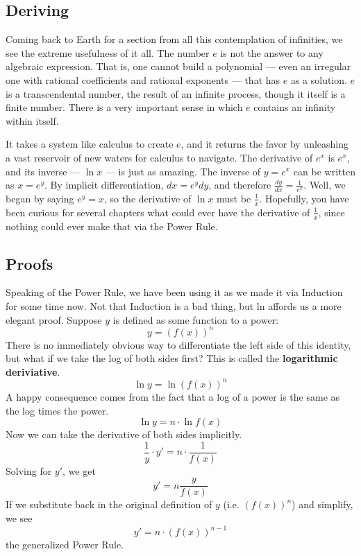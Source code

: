 
\subsection{Deriving}



Coming back to Earth for a section from all this contemplation of infinities, we see the
extreme usefulness of it all.  The number $e$ is not the answer to any algebraic 
expression.  That is, one cannot build a polynomial --- even an irregular one with
rational coefficients and rational exponents --- that has $e$ as a solution.  $e$ is a
transcendental number, the result of an infinite process, though it itself is a finite number.
There is a very important sense in which $e$ contains an infinity within itself.

It takes a system like calculus to create $e$, and it returns the favor by unleashing a
vast reservoir of new waters for calculus to navigate.  The derivative of $e^x$ is $e^x$,
and its inverse --- $\ln{x}$ --- is just as amazing.  The inverse of $y=e^x$ can be written
as $x=e^y$.  By implicit differentiation, $dx = e^ydy$, and therefore $\frac{dy}{dx} =
\frac{1}{e^x}$.  Well, we began by saying $e^y=x$, so the derivative of $\ln{x}$ must
be $\frac{1}{x}$.  Hopefully, you have been curious for several chapters what
could ever have the derivative of $\frac{1}{x}$, since nothing could ever make that
via the Power Rule.

\subsection{Proofs}
Speaking of the Power Rule, we have been using it as we made it via Induction for 
some time now.  Not that Induction is a bad thing, but ln affords us a more elegant 
proof.  Suppose $y$ is defined as some function to a power:
$$
y = \left(f(x)\right)^n
$$
There is no immediately obvious way to differentiate the left side of this identity, but
what if we take the log of both sides first?  This is called the \textbf{logarithmic deriviative}.
$$
\ln{y} = \ln{\left(f(x)\right)^n}
$$
A happy consequence comes from the fact that a log of a power is the same as the
log times the power.
$$
\ln{y} = n\cdot\ln{f(x)}
$$
Now we can take the derivative of both sides implicitly.
$$
\frac{1}{y} \cdot y' = n \cdot \frac{1}{f(x)}
$$
Solving for $y'$, we get
$$
y' = n \frac{y}{f(x)}
$$
If we substitute back in the original definition of $y$ (i.e. $\left(f(x)\right)^n$) and simplify,
we see
$$
y' = n\cdot{}\left(f(x)\right)^{n-1}
$$
the generalized Power Rule.



